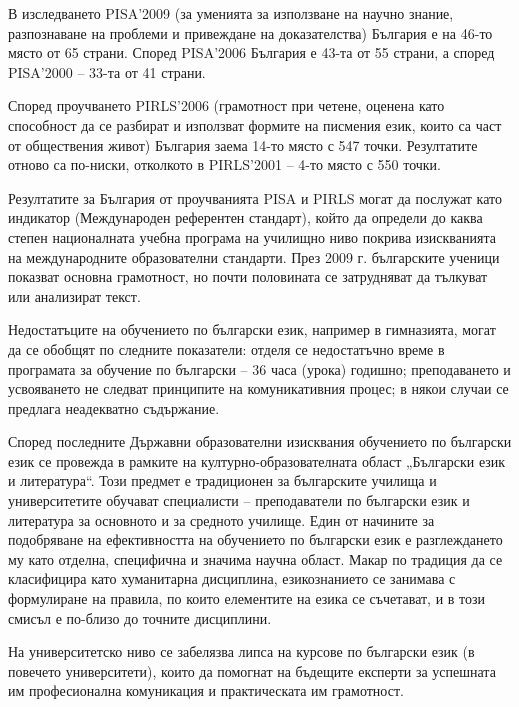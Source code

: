 \documentclass[]{../../metanetpaper}
\begin{document}
\begin{multicols}{2}
В изследването PISA'2009 \cite{oecd} (за уменията за използване на
 научно знание, разпознаване на проблеми и привеждане
 на доказателства) България е на 46-то място от 65 страни.
 Според PISA'2006 България е 43-та от 55 страни, а според
 PISA'2000 – 33-та от 41 страни.
 
Според проучването PIRLS'2006 \cite{nces} (грамотност при четене, оценена като способност да се разбират и използват формите на писмения език, които са част от обществения живот) България заема 14-то място с 547 точки. Резултатите отново са по-ниски, отколкото в PIRLS'2001 – 4-то място с 550 точки.

Резултатите за България от проучванията PISA и PIRLS могат да послужат като индикатор (Международен референтен стандарт), който да определи до каква степен
 националната учебна програма на училищно ниво
 покрива
 изискванията
 на
 международните образователни стандарти. През 2009 г. българските ученици показват основна грамотност, но почти половината се затрудняват да тълкуват или анализират
 текст.

Недостатъците на обучението по български език, например в гимназията, могат да се обобщят по следните
 показатели: отделя се недостатъчно време в програмата
 за обучение по български – 36 часа (урока) годишно;
 преподаването и усвояването не следват принципите на
 комуникативния процес; в някои случаи се предлага неадекватно
 съдържание.

Според последните Държавни образователни изисквания обучението по български език се провежда в рамките на културно-образователната област „Български
 език и литература“. Този предмет е традиционен за
 българските училища и университетите обучават
 специалисти – преподаватели по български език и литература за
 основното и за средното училище. Един от начините за
 подобряване на ефективността на обучението по български
 език е разглеждането му като отделна, специфична и значима научна област. Макар по традиция да се
 класифицира
 като
 хуманитарна
 дисциплина,
 езикознанието се занимава с формулиране на правила,
 по които елементите на езика се съчетават, и в този
 смисъл е по-близо до точните дисциплини.

На университетско ниво се забелязва липса на курсове по
 български език (в повечето университети), които да помогнат на
 бъдещите експерти за успешната им професионална
 комуникация и практическата им грамотност.



\end{multicols}
\end{document}
